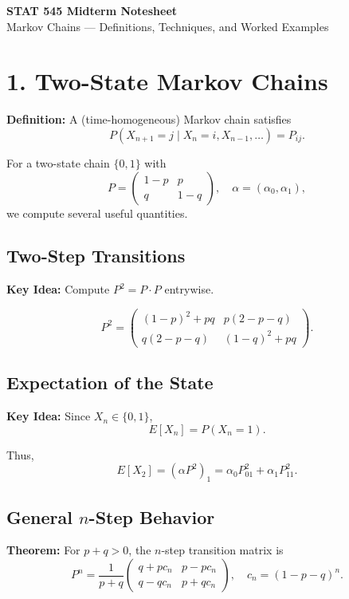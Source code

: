 \documentclass[11pt]{article}
\newcommand{\defn}[1]{\textcolor{mygreen}{\textbf{Definition:} #1}}
\newcommand{\thm}[1]{\textcolor{mygreen}{\textbf{Theorem:} #1}}
\newcommand{\idea}[1]{\textcolor{mygreen}{\textbf{Key Idea:} #1}}
\begin{document}
\begin{center}
{\Large \textbf{STAT 545 Midterm Notesheet}}\\
\vspace{0.2cm}
Markov Chains --- Definitions, Techniques, and Worked Examples
\end{center}

\vspace{0.4cm}

\section*{1. Two-State Markov Chains}

\defn{A (time-homogeneous) Markov chain satisfies
\[
P(X_{n+1}=j \mid X_n=i, X_{n-1},\dots) = P_{ij}.
\]}

For a two-state chain $\{0,1\}$ with
\[
P =
\begin{pmatrix}
1-p & p\\
q & 1-q
\end{pmatrix},
\quad
\alpha = (\alpha_0,\alpha_1),
\]
we compute several useful quantities.

\subsection*{Two-Step Transitions}
\idea{Compute $P^2 = P \cdot P$ entrywise.}

\[
P^2 =
\begin{pmatrix}
(1-p)^2 + pq & p(2-p-q)\\
q(2-p-q) & (1-q)^2 + pq
\end{pmatrix}.
\]

\subsection*{Expectation of the State}
\idea{Since $X_n \in \{0,1\}$,
\[
E[X_n] = P(X_n = 1).
\]}

Thus,
\[
E[X_2] = (\alpha P^2)_1
= \alpha_0 P^2_{01} + \alpha_1 P^2_{11}.
\]

\subsection*{General $n$-Step Behavior}
\thm{For $p+q>0$, the $n$-step transition matrix is}
\[
P^n = \frac{1}{p+q}
\begin{pmatrix}
q + p c_n & p - p c_n\\
q - q c_n & p + q c_n
\end{pmatrix},
\quad c_n = (1-p-q)^n.
\]
\end{document}
